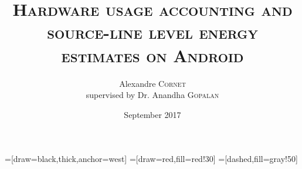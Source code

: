 
\title[Project presentation]{\textsc{Hardware usage accounting and source-line level energy estimates on Android}}
\author{Alexandre \textsc{Cornet}\\ {\footnotesize supervised by Dr. Anandha \textsc{Gopalan}}}
\date{September 2017}

=[draw=black,thick,anchor=west]
=[draw=red,fill=red!30]
=[dashed,fill=gray!50]
\begin{frame}
\titlepage
{}
\end{frame}
%

%
%
